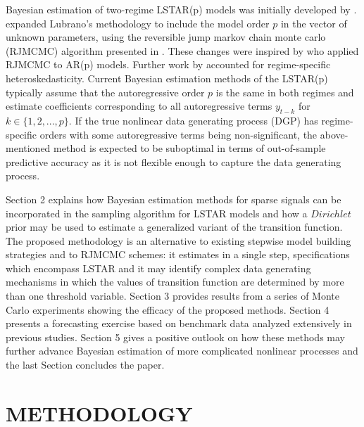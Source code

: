 Bayesian estimation of two-regime LSTAR(p) models was initially developed by \citep{Lubrano2000}. \citep{Lopes2006} expanded Lubrano's methodology to include the model order $p$ in the vector of unknown parameters, using the reversible jump markov chain monte carlo (RJMCMC) algorithm presented in \cite{Green1995}. These changes were inspired by \citep{Troughton1997} who applied RJMCMC to AR(p) models. Further work by \citep{Gerlach2008} accounted for regime-specific heteroskedasticity. Current Bayesian estimation methods of the LSTAR(p) typically assume that the autoregressive order $p$ is the same in both regimes and estimate coefficients corresponding to all autoregressive terms $y_{t-k}$ for $k \in \{1,2,...,p\}$. If the true nonlinear data generating process (DGP) has regime-specific orders with some autoregressive terms being non-significant, the above-mentioned method is expected to be suboptimal in terms of out-of-sample predictive accuracy as it is not flexible enough to capture the data generating process. 

Section 2 explains how Bayesian estimation methods for sparse signals can be incorporated in the sampling algorithm for LSTAR models and how a $Dirichlet$ prior may be used to estimate a generalized variant of the transition function. The proposed methodology is an alternative to existing stepwise model building strategies and to RJMCMC schemes: it estimates in a single step, specifications which encompass LSTAR and it may identify complex data generating mechanisms in which the values of transition function are determined by more than one threshold variable. Section 3 provides results from a series of Monte Carlo experiments showing the efficacy of the proposed methods. Section 4 presents a forecasting exercise based on benchmark data analyzed extensively in previous studies. Section 5 gives a positive outlook on how these methods may further advance Bayesian estimation of more complicated nonlinear processes and the last Section concludes the paper.



\section{METHODOLOGY}

